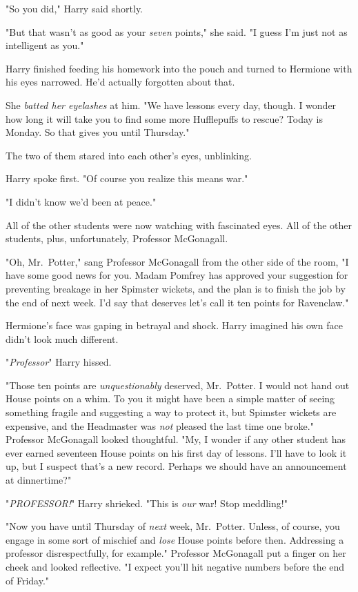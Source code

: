 "So you did," Harry said shortly.

"But that wasn't as good as your \emph{seven} points," she said. "I guess I'm
just not as intelligent as you."

Harry finished feeding his homework into the pouch and turned to Hermione with
his eyes narrowed. He'd actually forgotten about that.

She \emph{batted her eyelashes} at him. "We have lessons every day, though. I
wonder how long it will take you to find some more Hufflepuffs to rescue? Today
is Monday. So that gives you until Thursday."

The two of them stared into each other's eyes, unblinking.

Harry spoke first. "Of course you realize this means war."

"I didn't know we'd been at peace."

All of the other students were now watching with fascinated eyes. All of the
other students, plus, unfortunately, Professor McGonagall.

"Oh, Mr.~Potter," sang Professor McGonagall from the other side of the room, "I
have some good news for you. Madam Pomfrey has approved your suggestion for
preventing breakage in her Spimster wickets, and the plan is to finish the job
by the end of next week. I'd say that deserves{\el} let's call it ten points
for Ravenclaw."

Hermione's face was gaping in betrayal and shock. Harry imagined his own face
didn't look much different.

"\emph{Professor{\el}}" Harry hissed.

"Those ten points are \emph{unquestionably} deserved, Mr.~Potter. I would not
hand out House points on a whim. To you it might have been a simple matter of
seeing something fragile and suggesting a way to protect it, but Spimster
wickets are expensive, and the Headmaster was \emph{not} pleased the last time
one broke." Professor McGonagall looked thoughtful. "My, I wonder if any other
student has ever earned seventeen House points on his first day of lessons.
I'll have to look it up, but I suspect that's a new record. Perhaps we should
have an announcement at dinnertime?"

"\emph{PROFESSOR!}" Harry shrieked. "This is \emph{our} war! Stop meddling!"

"Now you have until Thursday of \emph{next} week, Mr.~Potter. Unless, of
course, you engage in some sort of mischief and \emph{lose} House points before
then. Addressing a professor disrespectfully, for example." Professor
McGonagall put a finger on her cheek and looked reflective. "I expect you'll
hit negative numbers before the end of Friday."

